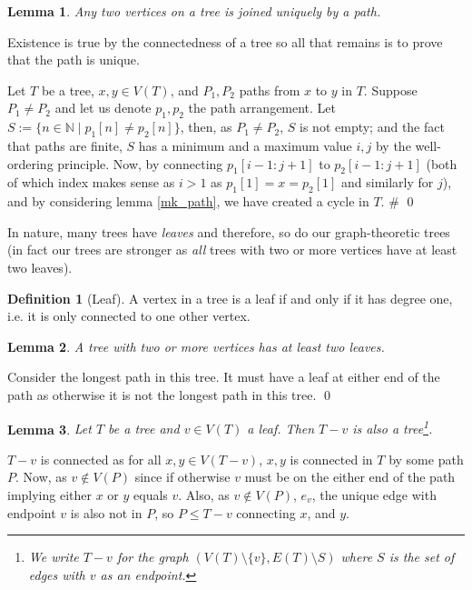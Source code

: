 \documentclass[
]{article}
\newtheorem{lemma}{Lemma}
\theoremstyle{definition}
\newtheorem{definition}{Definition}[section]
\begin{document}
\begin{lemma}
  Any two vertices on a tree is joined uniquely by a path.
\end{lemma}
\proof

Existence is true by the connectedness of a tree so all that remains is
to prove that the path is unique.

Let \(T\) be a tree, \(x, y \in V(T)\), and \(P_1, P_2\) paths from
\(x\) to \(y\) in \(T\). Suppose \(P_1 \neq P_2\) and let us denote
\(p_1, p_2\) the path arrangement. Let
\(S := \{ n \in \mathbb{N} \mid p_1[n] \neq p_2[n]\}\), then, as
\(P_1 \neq P_2\), \(S\) is not empty; and the fact that paths are
finite, \(S\) has a minimum and a maximum value \(i, j\) by the
well-ordering principle. Now, by connecting \(p_1[i - 1 : j + 1]\) to
\(p_2[i - 1 : j + 1]\) (both of which index makes sense as \(i > 1\) as
\(p_1[1] = x = p_2[1]\) and similarly for \(j\)), and by considering
lemma \ref{mk_path}, we have created a cycle in \(T\). \# \qed

In nature, many trees have \emph{leaves} and therefore, so do our
graph-theoretic trees (in fact our trees are stronger as \emph{all}
trees with two or more vertices have at least two leaves).

\begin{definition}[Leaf]
  A vertex in a tree is a leaf if and only if it has degree one, i.e. it is only 
  connected to one other vertex.
\end{definition}

\begin{lemma}\label{two_leaves}
  A tree with two or more vertices has at least two leaves.
\end{lemma}
\proof

Consider the longest path in this tree. It must have a leaf at either
end of the path as otherwise it is not the longest path in this tree.
\qed

\begin{lemma}\label{sub_leaf_is_tree}
  Let \(T\) be a tree and \(v \in V(T)\) a leaf. Then \(T - v\) is also a 
  tree\footnote{We write \(T - v\) for the graph 
  \((V(T)\setminus\{v\}, E(T)\setminus S)\) where \(S\) is the set of edges 
  with \(v\) as an endpoint.}.
\end{lemma}
\proof

\(T - v\) is connected as for all \(x, y \in V(T - v)\), \(x, y\) is
connected in \(T\) by some path \(P\). Now, as \(v \notin V(P)\) since
if otherwise \(v\) must be on the either end of the path implying either
\(x\) or \(y\) equals \(v\). Also, as \(v \notin V(P)\), \(e_v\), the
unique edge with endpoint \(v\) is also not in \(P\), so \(P \le T - v\)
connecting \(x\), and \(y\).
\end{document}
